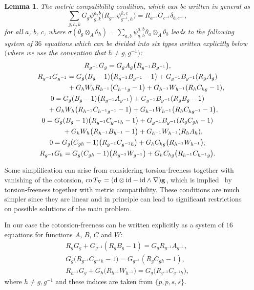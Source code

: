 \documentclass[pdftex]{sigma}
\numberwithin{equation}{section}
\newtheorem{Lemma}[Theorem]{Lemma}
\newcommand{\ip}{{\tilde{p}}}
\newcommand{\is}{{\tilde{s}}}
\begin{document}
\begin{Lemma}The metric compatibility condition, which can be written in general as
\begin{equation*}
\sum\limits_{g,h,k}G_g \psi^{a,b}_{g,k}\big(R_{g^{-1}}\psi^{k,c}_{g^{-1},h}\big)=R_{a^{-1}}G_{c^{-1}}\delta_{b,c^{-1}},
\end{equation*}
for all $a$, $b$, $c$, where $\sigma(\theta_g\otimes_A\theta_h)=\sum\limits_{a,b}\psi_{g,h}^{a,b}\theta_a\otimes_A \theta_b$ leads
to the following system of $36$ equations which can be divided into six types written
explicitly below $($where we use the convention that $h\neq g,g^{-1})$:
\begin{gather*}
 R_{g^{-1}}G_g=G_gA_g\big(R_{g^{-1}}B_{g^{-1}}\big),\\
R_{g^{-1}}G_{g^{-1}}=G_g(B_g-1)\big(R_{g^{-1}}B_{g^{-1}}-1\big)+G_{g^{-1}}B_{g^{-1}}(R_gA_g) \\
\hphantom{R_{g^{-1}}G_{g^{-1}}=}{}
+G_hW_hR_{h^{-1}}\big(C_{h^{-1}g}-1\big)+G_{h^{-1}}W_{h^{-1}}(R_hC_{hg}-1),\\
 0=G_g(B_g-1)\big(R_{g^{-1}}A_{g^{-1}}\big)+G_{g^{-1}}B_{g^{-1}}(R_gB_g-1)\\
\hphantom{0=}{} +G_hW_h\big(R_{h^{-1}}C_{h^{-1}g^{-1}}-1\big)+G_{h^{-1}}W_{h^{-1}}\big(R_hC_{hg^{-1}}-1\big),\\
 0=G_g(B_g-1)\big(R_{g^{-1}}C_{g^{-1}h}-1\big)+G_{g^{-1}}B_{g^{-1}}(R_gC_{gh}-1) \\
\hphantom{0=}{} +G_hW_h\big(R_{h^{-1}}B_{h^{-1}}-1\big)+G_{h^{-1}}W_{h^{-1}}(R_hA_h),\\
0=G_g(C_{gh}-1)\big(R_{g^{-1}}C_{g^{-1}h}\big)+G_hC_{hg}\big(R_{h^{-1}}W_{h^{-1}}\big),\\
R_{g^{-1}}G_h=G_g(C_{gh}-1)\big(R_{g^{-1}}W_{g^{-1}}\big)+G_hC_{hg}\big(R_{h^{-1}}C_{h^{-1}g}\big).
\end{gather*}
\end{Lemma}

Some simplification can arise from considering torsion-freeness together with vanishing of the cotorsion, $\operatorname{co}T_\nabla=({\rm d}\otimes\mathrm{id}-\mathrm{id}\wedge \nabla){\bf g}$,
which is implied~\cite{TM20} by torsion-freeness together with metric compatibility. These
conditions are much simpler since they are linear and in principle can lead to significant restrictions on possible solutions of the main problem.

In our case the cotorsion-freeness can be written explicitly as a system of $16$ equations for functions $A$, $B$, $C$ and $W$:
\begin{gather*}
R_gG_g+G_{g^{-1}}(R_gB_g-1)=G_gR_{g^{-1}}A_{g^{-1}},\\
G_g\big(R_{g^{-1}}C_{g^{-1}h}-1\big)=G_{g^{-1}}(R_gC_{gh}-1),\\
R_{h^{-1}}G_g+G_h\big(R_{h^{-1}}W_{h^{-1}}\big)=G_g\big(R_{g^{-1}}C_{g^{-1}h}\big),
\end{gather*}
where $h\neq g,g^{-1}$ and these indices are taken from $\{p,\ip,s,\is\}$.
\end{document}
